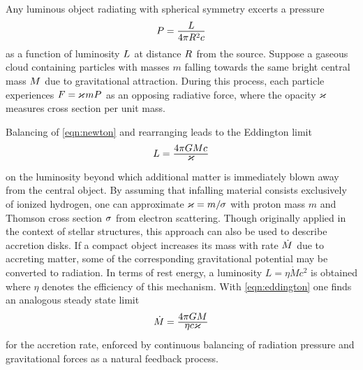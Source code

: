 Any luminous object radiating with spherical symmetry excerts a pressure
\begin{equation*}
	P = \frac{\raisebox{-0.3ex}{$L$}}{4\pi R^2 c}
\end{equation*}
as a function of luminosity $L \kern+0.5pt$ at distance $R \kern+0.5pt$ from the source.
Suppose a gaseous cloud containing particles with masses $m$ falling towards the same bright central mass $M \kern+0.5pt$
due to gravitational attraction. During this process, each particle experiences $F = \kern-0.3pt \varkappa \kern+0.7pt mP \kern+0.5pt$
as an opposing radiative force, where the opacity $\kern-0.3pt \varkappa \kern+0.7pt$ measures cross section per unit mass.

\newpage Balancing of \eqref{eqn:newton} and rearranging leads to the Eddington limit
\begin{equation}
	L = \frac{\raisebox{-0.3ex}{$4\pi GM c \kern+0.4pt$}}{\raisebox{0.8ex}{$\varkappa$}}
	\label{eqn:eddington}
\end{equation}
on the luminosity beyond which additional matter is immediately blown away from the central object. By assuming that infalling
material consists exclusively of ionized hydrogen, one can approximate $\varkappa \kern-0.1pt = m / \kern-0.5pt \sigma \kern+0.3pt$
with proton mass $m$ and Thomson cross section $\sigma \kern+0.5pt$ from electron scattering. Though originally applied in the
context of stellar structures, this approach can also be used to describe accretion disks. If a compact object increases its mass
with rate $\dot{M} \kern+0.5pt$ due to accreting matter, some of the corresponding gravitational potential may be converted to
radiation. In terms of rest energy, a luminosity $L = \eta\dot{M}c^2$ is obtained where $\eta$ denotes the efficiency of this
mechanism. With \eqref{eqn:eddington} one finds an analogous steady state limit
\begin{equation*}
	\dot{M} \kern-0.2pt = \frac{\raisebox{-0.3ex}{$4\pi GM$}}{\raisebox{0.8ex}{$\eta c \varkappa$}}
\end{equation*}
for the accretion rate, enforced by continuous balancing of radiation pressure and gravitational forces as a natural feedback process.
